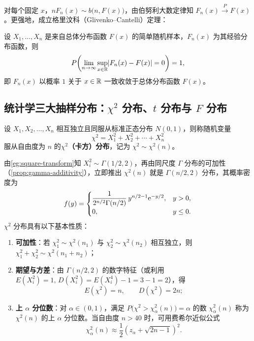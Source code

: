 对每个固定 $x$，$nF_n(x)\sim b\bigl(n,F(x)\bigr)$，由伯努利大数定律知 $F_n(x)\xrightarrow{P} F(x)$。更强地，成立格里汶科（Glivenko--Cantelli）定理：
\begin{theorem}[格里汶科定理]
\label{thm:glivenko}
设 $X_1,\ldots,X_n$ 是来自总体分布函数 $F(x)$ 的简单随机样本，$F_n(x)$ 为其经验分布函数，则
\[
  P\!\left(\lim_{n\to\infty}\sup_{x\in\mathbb{R}}\lvert F_n(x)-F(x)\rvert=0\right)=1,
\]
即 $F_n(x)$ 以概率 $1$ 关于 $x\in\mathbb{R}$ 一致收敛于总体分布函数 $F(x)$。
\end{theorem}

\subsection{统计学三大抽样分布：\texorpdfstring{$\chi^2$}{χ²} 分布、\texorpdfstring{$t$}{t} 分布与 \texorpdfstring{$F$}{F} 分布}

\begin{definition}[$\chi^2$ 分布]
\label{def:chi-square}
设 $X_1,X_2,\ldots,X_n$ 相互独立且同服从标准正态分布 $N(0,1)$，则称随机变量
\begin{equation}
  \chi^2=X_1^2+X_2^2+\cdots+X_n^2
  \label{eq:chi2-def}
\end{equation}
服从自由度为 $n$ 的\textbf{$\chi^2$（卡方）分布}，记为 $\chi^2\sim\chi^2(n)$。
\end{definition}

由\cref{eg:square-transform}知 $X_i^2\sim\Gamma(1/2,2)$，再由同尺度 $\Gamma$ 分布的可加性（\cref{prop:gamma-additivity}），立即推出 $\chi^2(n)$ 就是 $\Gamma(n/2,2)$ 分布，其概率密度为
\begin{equation}
  f(y)=
  \begin{cases}
    \dfrac{1}{2^{n/2}\Gamma(n/2)}\,y^{n/2-1}\mathrm{e}^{-y/2},& y>0,\\
    0,& y\le 0.
  \end{cases}
  \label{eq:chi2-density}
\end{equation}
$\chi^2$ 分布具有以下基本性质：
\begin{enumerate}
  \item \textbf{可加性}：若 $\chi_1^2\sim\chi^2(n_1)$ 与 $\chi_2^2\sim\chi^2(n_2)$ 相互独立，则 $\chi_1^2+\chi_2^2\sim\chi^2(n_1+n_2)$；
  \item \textbf{期望与方差}：由 $\Gamma(n/2,2)$ 的数字特征（或利用 $E(X_i^2)=1,\,D(X_i^2)=E(X_i^4)-1=3-1=2$），得
  \[
    E(\chi^2)=n,\qquad D(\chi^2)=2n;
  \]
  \item \textbf{上 $\alpha$ 分位数}：对 $\alpha\in(0,1)$，满足 $P\bigl(\chi^2>\chi_\alpha^2(n)\bigr)=\alpha$ 的数 $\chi_\alpha^2(n)$ 称为 $\chi^2(n)$ 的上 $\alpha$ 分位数。当自由度 $n>40$ 时，可用费希尔近似公式
  \[
    \chi_\alpha^2(n)\approx\frac{1}{2}\left(z_\alpha+\sqrt{2n-1}\right)^2.
  \]
\end{enumerate}

